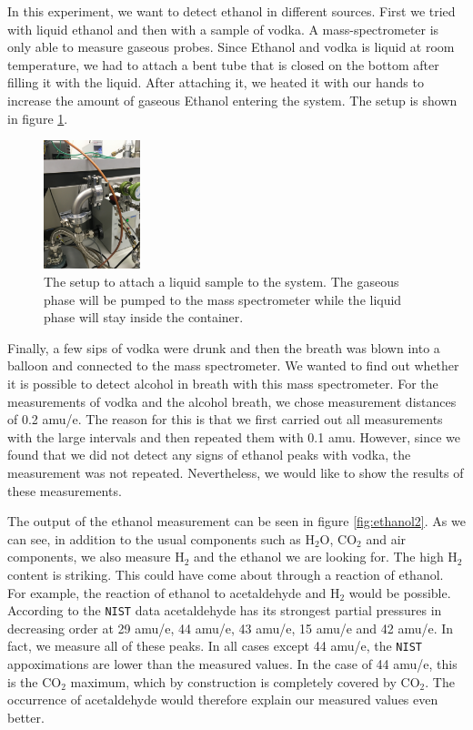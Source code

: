     In this experiment, we want to detect ethanol in different sources. First we tried with liquid ethanol and then with a sample of vodka. 
    A mass-spectrometer is only able to measure gaseous probes. Since Ethanol and vodka is liquid at room temperature, we had to attach a bent tube that is closed on the bottom after filling it with the liquid. After attaching it, we heated it with our hands to increase the amount of gaseous Ethanol entering the system. The setup is shown in figure \ref{fig:ethanol}.
    \begin{figure}[h!]
    \centering
    \includegraphics[angle=-90, origin=c,width=0.25\textwidth]{Report/pictures/liquids.JPG}
    \caption{The setup to attach a liquid sample to the system. The gaseous phase will be pumped to the mass spectrometer while the liquid phase will stay inside the container.}
    \label{fig:ethanol}
    \end{figure}
    Finally, a few sips of vodka were drunk and then the breath was blown into a balloon and connected to the mass spectrometer. We wanted to find out whether it is possible to detect alcohol in breath with this mass spectrometer. For the measurements of vodka and the alcohol breath, we chose measurement distances of 0.2 amu/e. The reason for this is that we first carried out all measurements with the large intervals and then repeated them with 0.1 amu. However, since we found that we did not detect any signs of ethanol peaks with vodka, the measurement was not repeated. Nevertheless, we would like to show the results of these measurements.
    
    The output of the ethanol measurement can be seen in figure \ref{fig:ethanol2}. As we can see, in addition to the usual components such as H$_2$O, CO$_2$ and air components, we also measure H$_2$ and the ethanol we are looking for. The high H$_2$ content is striking. This could have come about through a reaction of ethanol. For example, the reaction of ethanol to acetaldehyde and H$_2$ would be possible. According to the \texttt{NIST} data acetaldehyde has its strongest partial pressures in decreasing order at 29 amu/e, 44 amu/e, 43 amu/e, 15 amu/e and 42 amu/e. In fact, we measure all of these peaks. In all cases except 44 amu/e, the \texttt{NIST} appoximations are lower than the measured values. In the case of 44 amu/e, this is the CO$_2$ maximum, which by construction is completely covered by CO$_2$. The occurrence of acetaldehyde would therefore explain our measured values even better. 
    
